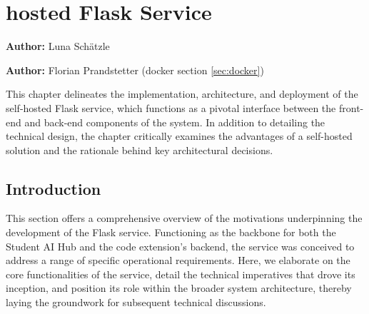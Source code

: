 \chapter{hosted Flask Service}
\label{cha:hosted_flask_service}
\textbf{Author:} Luna Schätzle

\textbf{Author:} Florian Prandstetter (docker section \ref{sec:docker})

This chapter delineates the implementation, architecture, and deployment of the self-hosted Flask service, 
which functions as a pivotal interface between the front-end and back-end components of the system. 
In addition to detailing the technical design, the chapter critically examines the advantages of a self-hosted solution 
and the rationale behind key architectural decisions.

\section{Introduction}
This section offers a comprehensive overview of the motivations underpinning the development of the Flask service. 
Functioning as the backbone for both the Student AI Hub and the code extension’s backend, 
the service was conceived to address a range of specific operational requirements. 
Here, we elaborate on the core functionalities of the service, detail the technical imperatives that drove its inception, 
and position its role within the broader system architecture, thereby laying the groundwork for subsequent technical discussions.

